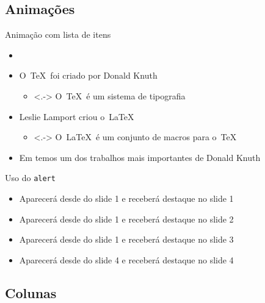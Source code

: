 \documentclass[aspectratio=169]{beamer}
\begin{document}
\subsection{Animações}

\begin{frame}{Animação com lista de itens}
\begin{itemize}[<+->]
    \item{} 
    \item O~\TeX~foi criado por Donald Knuth
    \begin{itemize}
        \item<.-> O~\TeX~é um sistema de tipografia 
    \end{itemize}
    \item Leslie Lamport criou o~\LaTeX~\cite{lamport94}
    \begin{itemize}
        \item<.-> O~\LaTeX~é um conjunto de macros para o~\TeX 
    \end{itemize}
    \item Em \textcite{knuth74} temos um dos trabalhos mais importantes de Donald Knuth
    
\end{itemize}
\end{frame}

\begin{frame}{Uso do \texttt{alert}}
    \begin{itemize}
        \item<1-| alert@1> Aparecerá desde do slide 1 e receberá destaque no slide 1
        \item<1-| alert@2> Aparecerá desde do slide 1 e receberá destaque no slide 2
        \item<1-| alert@3> Aparecerá desde do slide 1 e receberá destaque no slide 3
        \item<4-| alert@4> Aparecerá desde do slide 4 e receberá destaque no slide 4
    \end{itemize} 
\end{frame}

\subsection{Colunas}
\end{document}
